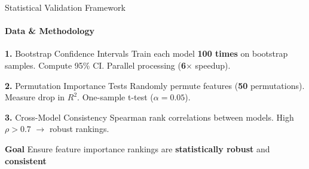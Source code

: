 \documentclass[aspectratio=169,8pt]{beamer}
\begin{document}
    \begin{frame}{Statistical Validation Framework}
        \framesubtitle{Data \& Methodology}

        \begin{block}{\textbf{1.} Bootstrap Confidence Intervals}
            Train each model \textbf{100 times} on bootstrap samples. Compute 95\% CI. Parallel processing (\textbf{6$\times$} speedup).
        \end{block}

        \begin{block}{\textbf{2.} Permutation Importance Tests}
            Randomly permute features (\textbf{50} permutations). Measure drop in $R^2$. One-sample t-test ($\alpha = 0.05$).
        \end{block}

        \begin{block}{\textbf{3.} Cross-Model Consistency}
            Spearman rank correlations between models. High $\rho > 0.7$ $\rightarrow$ robust rankings.
        \end{block}

        \vspace{0.2cm}
        \begin{alertblock}{\textbf{Goal}}
            Ensure feature importance rankings are \textbf{statistically robust} and \textbf{consistent}
        \end{alertblock}
    \end{frame}
\end{document}
